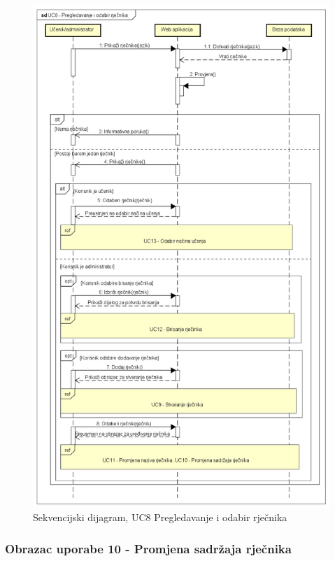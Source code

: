 \begin{figure}[p]
	\includegraphics[scale=0.5]{dijagrami/UC8 - Pregledavanje i odabir rječnika.png}
	\centering
	\caption{Sekvencijski dijagram, UC8 Pregledavanje i odabir rječnika}
	\label{fig:uc-odabir-rjecnika}
\end{figure}

\eject

\subsubsection{{Obrazac uporabe 10 - Promjena sadržaja rječnika}}

